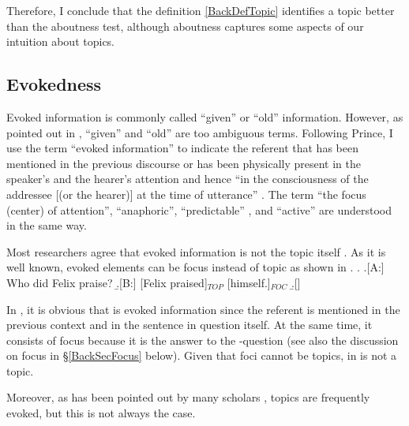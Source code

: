 Therefore, I conclude that
the definition \ref{BackDefTopic} identifies a topic
better than the aboutness test,
although aboutness captures some aspects of our intuition about topics.


\subsection{Evokedness}\label{BackEvoked}

Evoked information is commonly called ``given'' or ``old'' information.
However, as pointed out in ,
``given'' and ``old'' are too ambiguous terms.
Following Prince,
I use the term ``evoked information'' to indicate the referent that has been mentioned in the previous discourse or has been physically present in the speaker's and the hearer's attention
and hence ``in the consciousness of the addressee [(or the hearer)] at the time of utterance'' \cite[30]{chafe76}.
The term ``the focus (center) of attention'', ``anaphoric'', ``predictable'' \cite{kuno72}, and ``active'' \cite{portner07} are understood in the same way.

Most researchers agree that evoked information is not the topic itself \cite[]{reinhart81,gundel88,lambrecht94}.
As it is well known, evoked elements can be focus instead of topic as shown in \Next[B].
%
\ex.\label{BackExHimself} \a.[A:] Who did Felix praise?
     \b.[B:] [Felix praised]$_{TOP}$ [himself.]$_{FOC}$
     \b.[] \hfill{\cite[72, style modified by NN]{reinhart81}}

In \Last[B], it is obvious that  is evoked information
since the referent is mentioned in the previous context and in the sentence in question itself.
At the same time, it consists of focus because
it is the answer to the -question (see also the discussion on focus in \S \ref{BackSecFocus} below).
Given that foci cannot be topics,
 in \Last[B] is not a topic.

Moreover, as has been pointed out by many scholars \cite[see][]{li76,givon83,halliday04},
topics are frequently evoked, but this is not always the case.


%
%
%

